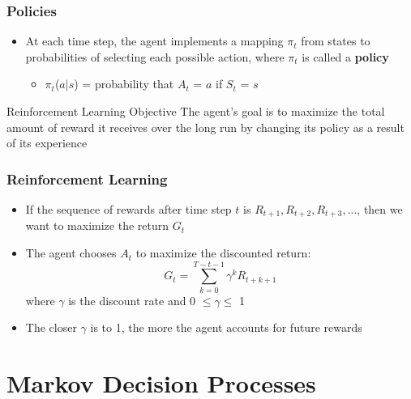 \documentclass{beamer}
\begin{document}

\begin{frame}
\frametitle{Policies}
\begin{itemize}
\item At each time step, the agent implements a mapping $\pi_t$ from states to probabilities of selecting each possible action, where $\pi_t$ is called a \textbf{policy}
   \begin{itemize}
   	\item $\pi_t$($a|s$) = probability that $A_t$ = $a$ if $S_t$ = $s$
      \end{itemize}
\end{itemize}
\begin{block}{Reinforcement Learning Objective}
The agent's goal is to maximize the total amount of reward it receives over the long run by changing its policy as a result of its experience
\end{block}
\end{frame}



\begin{frame}
\frametitle{Reinforcement Learning}
\begin{itemize}
\item If the sequence of rewards after time step $t$ is $R_{t+1}, R_{t+2}, R_{t+3},...$, then we want to maximize the return $G_t$
\item The agent chooses $A_t$ to maximize the discounted return: 
\begin{equation}
G_t = \sum_{k=0}^{T-t-1} \gamma^k R_{t+k+1}
\nonumber
\end{equation}
where $\gamma$ is the discount rate and 0 $\leq \gamma \leq$ 1
\item The closer $\gamma$ is to 1, the more the agent accounts for future rewards
\end{itemize}
\end{frame}

\section{Markov Decision Processes} %
\end{document}
